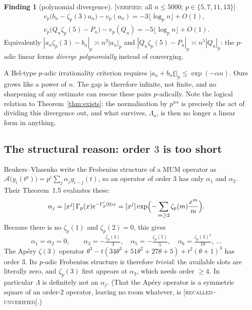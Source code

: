 \documentclass[11pt,reqno]{article}
\newcommand{\Gp}{\Gamma_p}
\newcommand{\vp}{v_p}
\newcommand{\floor}[1]{\lfloor #1 \rfloor}
\newcommand{\VER}[1]{{\normalfont\textsc{[verified:} #1\textsc{]}}}
\newcommand{\RECALLED}{{\normalfont\textsc{[recalled--unverified]}}}
\theoremstyle{plain}
\theoremstyle{definition}
\newtheorem{finding}[theorem]{Finding}
\theoremstyle{remark}
\numberwithin{equation}{section}
\begin{document}
\begin{finding}[polynomial divergence]\label{find:diverge}
\VER{all $n\le5000$; $p\in\{5,7,11,13\}$}
\begin{gather*}
  \vp\bigl(b_n-\zeta_p(3)a_n\bigr)-\vp(a_n)=-3\floor{\log_pn}+O(1),\\
  \vp\bigl(Q_n\zeta_p(5)-P_n\bigr)-\vp(Q_n)=-5\floor{\log_pn}+O(1).
\end{gather*}
Equivalently
$|a_n\zeta_p(3)-b_n|_p\asymp n^3|a_n|_p$ and
$|Q_n\zeta_p(5)-P_n|_p\asymp n^5|Q_n|_p$: the $p$-adic linear forms
\emph{diverge polynomially} instead of converging.
\end{finding}

A Bel-type $p$-adic irrationality criterion \cite[Lemma~4]{LSZ2025} requires
$|a_n+b_n\xi|_p\le\exp(-\alpha n)$.  Ours grows like a power of $n$.  The gap is
therefore infinite, not finite, and no sharpening of any estimate can rescue
these pairs $p$-adically.  Note the logical relation to
Theorem~\ref{thm:exists}: the normalisation by $p^{ws}$ is precisely the act of
dividing this divergence out, and what survives, $\Lambda_a$, is then no longer
a linear form in anything.

\subsection{The structural reason: order $3$ is too short}\label{ss:order3}

Beukers--Vlasenko \cite[Prop.~1.3]{BV2025} write the Frobenius structure of a
MUM operator as $\mathcal{A}\bigl(y_i(t^p)\bigr)=p^{i}\sum_j\alpha_jy_{i-j}(t)$,
so an operator of order $3$ has only $\alpha_1$ and $\alpha_2$.  Their
Theorem~1.5 evaluates these:
\begin{equation}\label{eq:BVgen}
  \alpha_j=[x^j]\,\Gp(x)e^{-\Gp'(0)x}
         =[x^j]\exp\Bigl(-\sum_{m\ge2}\zeta_p(m)\frac{x^m}{m}\Bigr).
\end{equation}
Because there is no $\zeta_p(1)$ and $\zeta_p(2)=0$, this gives
\[
  \alpha_1=\alpha_2=0,\qquad
  \alpha_3=-\tfrac{\zeta_p(3)}{3},\quad
  \alpha_5=-\tfrac{\zeta_p(5)}{5},\quad
  \alpha_6=\tfrac{\zeta_p(3)^2}{18},\ \dots
\]
The Ap\'ery $\zeta(3)$ operator
$\theta^3-t(34\theta^3+51\theta^2+27\theta+5)+t^2(\theta+1)^3$ has order $3$.
Its $p$-adic Frobenius structure is therefore \emph{trivial}: the available
slots are literally zero, and $\zeta_p(3)$ first appears at $\alpha_3$, which
needs order $\ge4$.  In particular $\Lambda$ is definitely not an $\alpha_j$.
(That the Ap\'ery operator is a symmetric square of an order-$2$ operator,
leaving no room whatever, is \RECALLED.)
\end{document}
